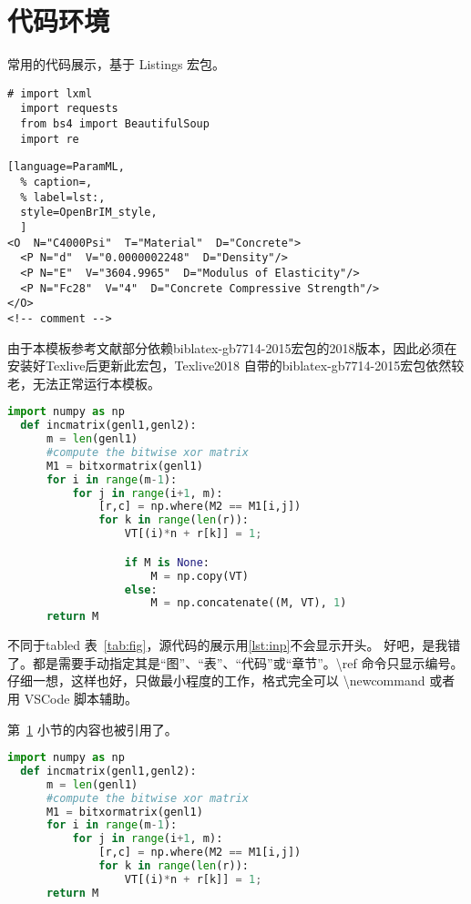 \documentclass[../Main/thesis]{subfiles}
\begin{document}
\section{代码环境} \label{sec:code}
常用的代码展示，基于 Listings 宏包。
\begin{lstlisting}[style=monocolor,
  caption={first lst env},
  label={no label},
  name=测试第一个代码,
  language=PythonPlus]
  # import lxml
  import requests
  from bs4 import BeautifulSoup
  import re
\end{lstlisting}

\begin{lstlisting}[language=ParamML,
  % caption=,
  % label=lst:,
  style=OpenBrIM_style,
  ]
<O  N="C4000Psi"  T="Material"  D="Concrete">
  <P N="d"  V="0.0000002248"  D="Density"/>
  <P N="E"  V="3604.9965"  D="Modulus of Elasticity"/>
  <P N="Fc28"  V="4"  D="Concrete Compressive Strength"/>
</O>
<!-- comment -->
\end{lstlisting}

由于本模板参考文献部分依赖biblatex-gb7714-2015宏包的2018版本，因此必须在安装好Texlive后更新此宏包，Texlive2018 自带的biblatex-gb7714-2015宏包依然较老，无法正常运行本模板。

\begin{lstlisting}[language=Python,
  caption=Second CODE Block,
  label=lst:2nd,
  style=colored]
  import numpy as np
  def incmatrix(genl1,genl2):
      m = len(genl1)
      #compute the bitwise xor matrix
      M1 = bitxormatrix(genl1)
      for i in range(m-1):
          for j in range(i+1, m):
              [r,c] = np.where(M2 == M1[i,j])
              for k in range(len(r)):
                  VT[(i)*n + r[k]] = 1;

                  if M is None:
                      M = np.copy(VT)
                  else:
                      M = np.concatenate((M, VT), 1)
      return M
\end{lstlisting}

不同于tabled 表~\ref{tab:fig}，源代码的展示用\ref{lst:inp}不会显示开头。
好吧，是我错了。都是需要手动指定其是“图”、“表”、“代码”或“章节”。\textbackslash ref 命令只显示编号。
仔细一想，这样也好，只做最小程度的工作，格式完全可以 \textbackslash newcommand 或者用 VSCode 脚本辅助。

第~\ref{sec:code} 小节的内容也被引用了。

\begin{lstlisting}[language=Python,
  caption=中文标题没有括号,
  label=lst:outer,
  style=colorEX]
  import numpy as np
  def incmatrix(genl1,genl2):
      m = len(genl1)
      #compute the bitwise xor matrix
      M1 = bitxormatrix(genl1)
      for i in range(m-1):
          for j in range(i+1, m):
              [r,c] = np.where(M2 == M1[i,j])
              for k in range(len(r)):
                  VT[(i)*n + r[k]] = 1;
      return M
\end{lstlisting}
\end{document}
